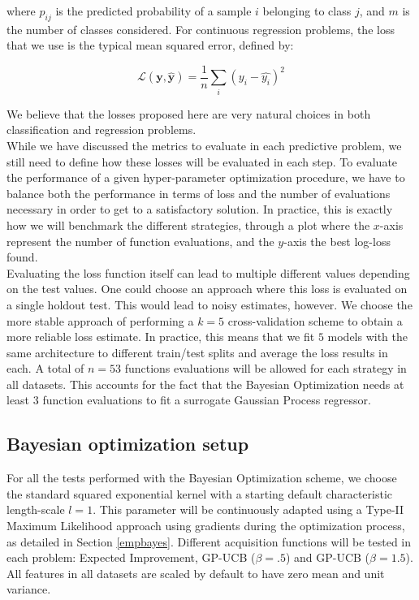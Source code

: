 \documentclass[10pt,a4paper,twoside]{book}
\begin{document}
where $\hat{p}_{ij}$ is the predicted probability of a sample $i$ belonging to class $j$, and $m$ is the number of classes considered. For continuous regression problems, the loss that we use is the typical mean squared error, defined by:

\begin{equation}
\mathcal{L}(\boldsymbol{y}, \boldsymbol{\hat{y}}) = \dfrac{1}{n} \sum_i \left(y_i - \hat{y_i}\right)^2
\end{equation}

We believe that the losses proposed here are very natural choices in both classification and regression problems.\\

While we have discussed the metrics to evaluate in each predictive problem, we still need to define how these losses will be evaluated in each step. To evaluate the performance of a given hyper-parameter optimization procedure, we have to balance both the performance in terms of loss and the number of evaluations necessary in order to get to a satisfactory solution. In practice, this is exactly how we will benchmark the different strategies, through a plot where the $x$-axis represent the number of function evaluations, and the $y$-axis the best log-loss found.\\

Evaluating the loss function itself can lead to multiple different values depending on the test values. One could choose an approach where this loss is evaluated on a single holdout test. This would lead to noisy estimates, however. We choose the more stable approach of performing a $k=5$ cross-validation scheme to obtain a more reliable loss estimate. In practice, this means that we fit $5$ models with the same architecture to different train/test splits and average the loss results in each. A total of $n=53$ functions evaluations will be allowed for each strategy in all datasets. This accounts for the fact that the Bayesian Optimization needs at least $3$ function evaluations to fit a surrogate Gaussian Process regressor.

\subsection{Bayesian optimization setup}

For all the tests performed with the Bayesian Optimization scheme, we choose the standard squared exponential kernel with a starting default characteristic length-scale $l=1$. This parameter will be continuously adapted using a Type-II Maximum Likelihood approach using gradients during the optimization process, as detailed in Section \ref{empbayes}. Different acquisition functions will be tested in each problem: Expected Improvement, GP-UCB ($\beta= .5$) and GP-UCB ($\beta = 1.5$). All features in all datasets are scaled by default to have zero mean and unit variance.
\end{document}
